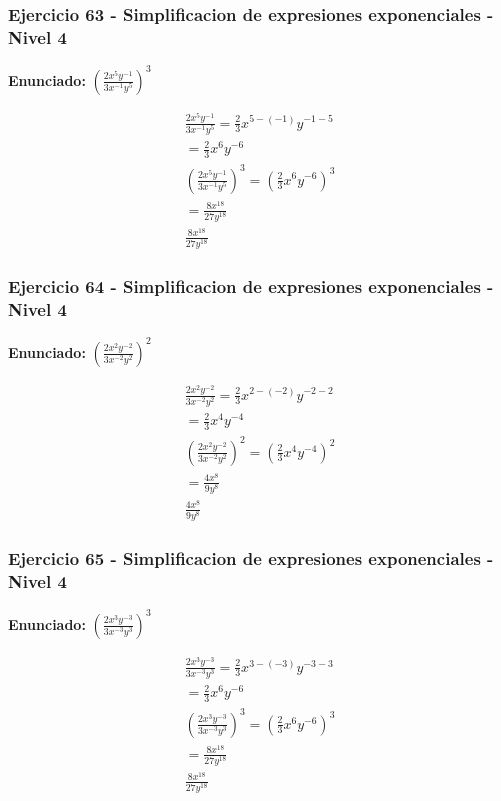 \documentclass[12pt,a4paper]{article}
\begin{document}
\subsubsection*{Ejercicio 63 - Simplificacion de expresiones exponenciales - Nivel 4}
\textbf{Enunciado:} \(\left(\frac{2x^{5}y^{-1}}{3x^{-1}y^{5}}\right)^{3}\)

\[
\begin{aligned}
\frac{2x^{5}y^{-1}}{3x^{-1}y^{5}}=\frac{2}{3}x^{5-(-1)}y^{-1-5}\\
=\frac{2}{3}x^{6}y^{-6}\\
\left(\frac{2x^{5}y^{-1}}{3x^{-1}y^{5}}\right)^{3}=\left(\frac{2}{3}x^{6}y^{-6}\right)^{3}\\
=\frac{8x^{18}}{27y^{18}}\\
\boxed{\frac{8x^{18}}{27y^{18}}}
\end{aligned}
\]


\subsubsection*{Ejercicio 64 - Simplificacion de expresiones exponenciales - Nivel 4}
\textbf{Enunciado:} \(\left(\frac{2x^{2}y^{-2}}{3x^{-2}y^{2}}\right)^{2}\)

\[
\begin{aligned}
\frac{2x^{2}y^{-2}}{3x^{-2}y^{2}}=\frac{2}{3}x^{2-(-2)}y^{-2-2}\\
=\frac{2}{3}x^{4}y^{-4}\\
\left(\frac{2x^{2}y^{-2}}{3x^{-2}y^{2}}\right)^{2}=\left(\frac{2}{3}x^{4}y^{-4}\right)^{2}\\
=\frac{4x^{8}}{9y^{8}}\\
\boxed{\frac{4x^{8}}{9y^{8}}}
\end{aligned}
\]


\subsubsection*{Ejercicio 65 - Simplificacion de expresiones exponenciales - Nivel 4}
\textbf{Enunciado:} \(\left(\frac{2x^{3}y^{-3}}{3x^{-3}y^{3}}\right)^{3}\)

\[
\begin{aligned}
\frac{2x^{3}y^{-3}}{3x^{-3}y^{3}}=\frac{2}{3}x^{3-(-3)}y^{-3-3}\\
=\frac{2}{3}x^{6}y^{-6}\\
\left(\frac{2x^{3}y^{-3}}{3x^{-3}y^{3}}\right)^{3}=\left(\frac{2}{3}x^{6}y^{-6}\right)^{3}\\
=\frac{8x^{18}}{27y^{18}}\\
\boxed{\frac{8x^{18}}{27y^{18}}}
\end{aligned}
\]
\end{document}
